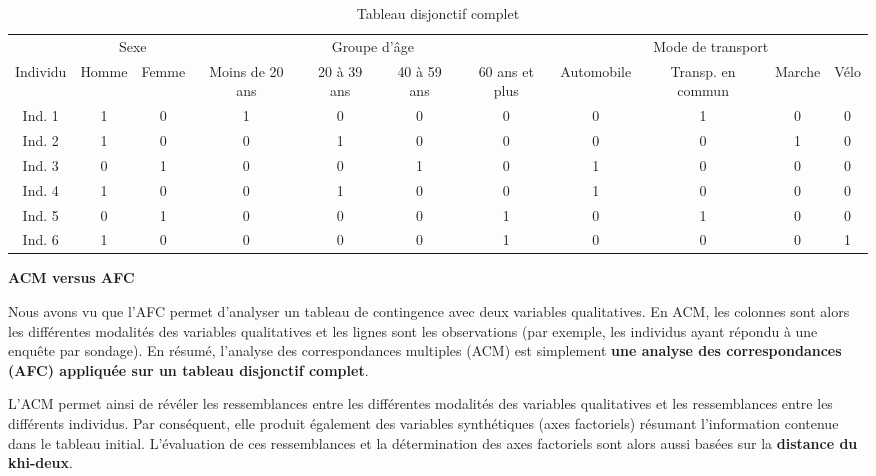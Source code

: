 \documentclass[
  11pt,
  french,
]{book}
\makeatletter
\newenvironment{kframev}{%
\medskip{}
\setlength{\fboxsep}{.8em}
 \def\at@end@of@kframev{}%
 \ifinner\ifhmode%
  \def\at@end@of@kframev{\end{minipage}}%
  \begin{minipage}{\columnwidth}%
 \fi\fi%
 \def\FrameCommand##1{\hskip\@totalleftmargin \hskip-\fboxsep
 \colorbox{shadebluecolor}{##1}\hskip-\fboxsep
     \hskip-\linewidth \hskip-\@totalleftmargin \hskip\columnwidth}%
 \MakeFramed {\advance\hsize-\width
   \@totalleftmargin\z@ \linewidth\hsize
   \@setminipage}}%
 {\par\unskip\endMakeFramed%
 \at@end@of@kframev}
\newenvironment{rmdblock}[1]
  {
  \begin{itemize}
  \renewcommand{\labelitemi}{
    \raisebox{-.7\height}[0pt][0pt]{
      {\setkeys{Gin}{width=3em,keepaspectratio}\texttt{[image: images/\#1]}}
    }
  }
  \setlength{\fboxsep}{1em}
  \begin{kframev}
  \small
  \item
  }
  {
  \end{kframev}
  \end{itemize}
  }
\newenvironment{bloc_astuce}
  {\begin{rmdblock}{astuce}}
  {\end{rmdblock}}
\makeatother
\begin{document}
\begin{table}

\caption{\label{tab:TabACM3}Tableau disjonctif complet}
\centering
\fontsize{8}{10}\selectfont
\begin{tabular}[t]{ccccccccccc}
\toprule
\multicolumn{1}{c}{ } & \multicolumn{2}{c}{Sexe} & \multicolumn{4}{c}{Groupe d'âge} & \multicolumn{4}{c}{Mode de transport} \\
\cmidrule(l{3pt}r{3pt}){2-3} \cmidrule(l{3pt}r{3pt}){4-7} \cmidrule(l{3pt}r{3pt}){8-11}
Individu & Homme & Femme & Moins de 20 ans & 20 à 39 ans & 40 à 59 ans & 60 ans et plus & Automobile & Transp. en commun & Marche & Vélo\\
\midrule
Ind. 1 & 1 & 0 & 1 & 0 & 0 & 0 & 0 & 1 & 0 & 0\\
Ind. 2 & 1 & 0 & 0 & 1 & 0 & 0 & 0 & 0 & 1 & 0\\
Ind. 3 & 0 & 1 & 0 & 0 & 1 & 0 & 1 & 0 & 0 & 0\\
Ind. 4 & 1 & 0 & 0 & 1 & 0 & 0 & 1 & 0 & 0 & 0\\
Ind. 5 & 0 & 1 & 0 & 0 & 0 & 1 & 0 & 1 & 0 & 0\\
\addlinespace
Ind. 6 & 1 & 0 & 0 & 0 & 0 & 1 & 0 & 0 & 0 & 1\\
\bottomrule
\end{tabular}
\end{table}

\begin{bloc_astuce}
\textbf{ACM versus AFC}

Nous avons vu que l'AFC permet d'analyser un tableau de contingence avec deux variables qualitatives. En ACM, les colonnes sont alors les différentes modalités des variables qualitatives et les lignes sont les observations (par exemple, les individus ayant répondu à une enquête par sondage). En résumé, l'analyse des correspondances multiples (ACM) est simplement \textbf{une analyse des correspondances (AFC) appliquée sur un tableau disjonctif complet}.

L'ACM permet ainsi de révéler les ressemblances entre les différentes modalités des variables qualitatives et les ressemblances entre les différents individus. Par conséquent, elle produit également des variables synthétiques (axes factoriels) résumant l'information contenue dans le tableau initial. L'évaluation de ces ressemblances et la détermination des axes factoriels sont alors aussi basées sur la \textbf{distance du khi-deux}.

\end{bloc_astuce}
\end{document}
